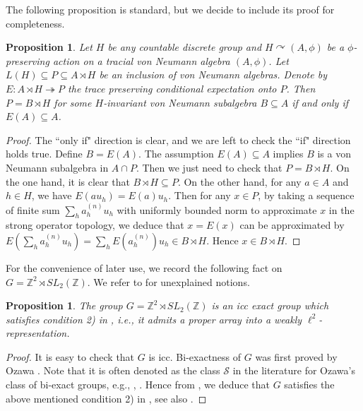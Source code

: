 \documentclass[12pt]{amsart}
\newtheorem{prop}[theorem]{Proposition}
\theoremstyle{definition}
\theoremstyle{remark}
\begin{document}
The following proposition is standard, but we decide to include its proof for completeness. 

\begin{prop}\label{prop: detect crossed product}
Let $H$ be any countable discrete group and $H\curvearrowright (A,\phi)$ be a $\phi$-preserving action on a tracial von Neumann algebra $(A,\phi)$.
Let $L(H)\subseteq P\subseteq A\rtimes H$ be an inclusion of von Neumann algebras. Denote by $E: A\rtimes H\twoheadrightarrow P$ the trace preserving conditional expectation onto $P$. Then $P=B\rtimes H$ for some $H$-invariant von Neumann subalgebra $B\subseteq A$ if and only if $E(A)\subseteq A$.
\end{prop}

\begin{proof}
The ``only if" direction is clear, and we are left to check the ``if" direction holds true. Define $B=E(A)$. The assumption $E(A)\subseteq A$ implies $B$ is a von Neumann subalgebra in $A\cap P$. Then we just need to check that $P=B\rtimes H$. On the one hand, it is clear that $B\rtimes H\subseteq P$. On the other hand, for any $a\in A$ and $h\in H$, we have $E(au_h)=E(a)u_h$. Then for any $x\in P$, by taking a sequence of finite sum $\sum_ha_h^{(n)}u_h$ with uniformly bounded norm to approximate $x$ in the strong operator topology, we deduce that $x=E(x)$ can be approximated by $E(\sum_ha_h^{(n)}u_h)=\sum_hE(a_h^{(n)})u_h\in B\rtimes H$. Hence $x\in B\rtimes H$. 
\end{proof}


For the convenience of later use, we record the following fact on $G=\mathbb{Z}^2\rtimes SL_2(\mathbb{Z})$. We refer to \cites{cs, cds} for unexplained notions.

\begin{prop}\label{prop: G as in chifan-das-sun}
The group $G=\mathbb{Z}^2\rtimes SL_2(\mathbb{Z})$ is an icc exact group which satisfies condition 2) in \cite[Theorem 5.1]{cds}, i.e., it admits a proper array into a weakly $\ell^2$-representation.
\end{prop}
\begin{proof}
It is easy to check that $G$ is icc.  Bi-exactness of $G$ was first proved by Ozawa \cite{ozawa_hokkaido}. Note that it is often denoted as the class $\mathcal{S}$ in the literature for Ozawa's class of bi-exact groups, e.g., \cite{ozawa_imrn}, \cite[Remark 19]{sako}. Hence from \cite[Definition 1.6 and Proposition 1.11]{cs}, we deduce that $G$ satisfies the above mentioned condition 2) in \cite[Theorem 5.1]{cds}, see also \cite[Proposition 1.9]{cs}.
\end{proof}
\end{document}
